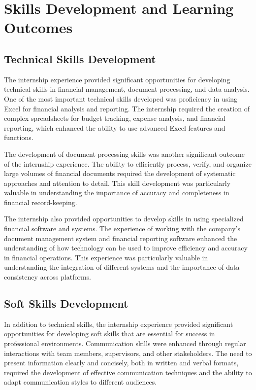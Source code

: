 \section{Skills Development and Learning Outcomes}

\subsection{Technical Skills Development}
The internship experience provided significant opportunities for developing technical skills in financial management, document processing, and data analysis. One of the most important technical skills developed was proficiency in using Excel for financial analysis and reporting. The internship required the creation of complex spreadsheets for budget tracking, expense analysis, and financial reporting, which enhanced the ability to use advanced Excel features and functions.

The development of document processing skills was another significant outcome of the internship experience. The ability to efficiently process, verify, and organize large volumes of financial documents required the development of systematic approaches and attention to detail. This skill development was particularly valuable in understanding the importance of accuracy and completeness in financial record-keeping.

The internship also provided opportunities to develop skills in using specialized financial software and systems. The experience of working with the company's document management system and financial reporting software enhanced the understanding of how technology can be used to improve efficiency and accuracy in financial operations. This experience was particularly valuable in understanding the integration of different systems and the importance of data consistency across platforms.

\subsection{Soft Skills Development}
In addition to technical skills, the internship experience provided significant opportunities for developing soft skills that are essential for success in professional environments. Communication skills were enhanced through regular interactions with team members, supervisors, and other stakeholders. The need to present information clearly and concisely, both in written and verbal formats, required the development of effective communication techniques and the ability to adapt communication styles to different audiences.

